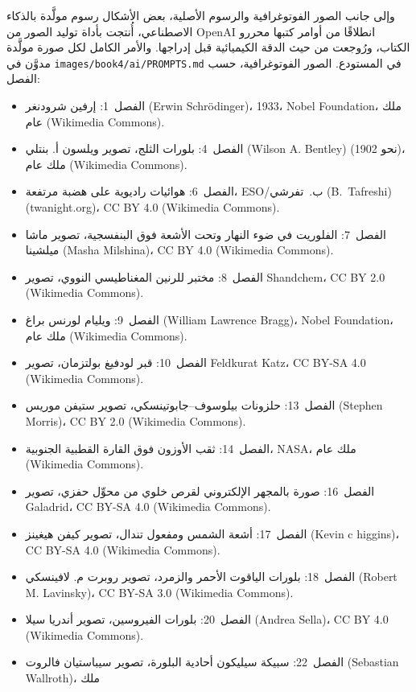 \bigskip
وإلى جانب الصور الفوتوغرافية والرسوم الأصلية، بعض الأشكال
رسوم مولَّدة بالذكاء الاصطناعي، أُنتجت بأداة توليد الصور من OpenAI انطلاقًا من
أوامر كتبها محررو الكتاب، ورُوجعت من حيث الدقة الكيميائية قبل
إدراجها. والأمر الكامل لكل صورة مولَّدة
مدوَّن في \texttt{images/book4/ai/PROMPTS.md} في المستودع.
\bigskip
\noindent الصور الفوتوغرافية، حسب الفصل:
\begin{itemize}\small
  \item الفصل~1: إرفين شرودنغر (Erwin Schr\"odinger)، 1933، Nobel Foundation، ملك عام
        (Wikimedia Commons).
  \item الفصل~4: بلورات الثلج، تصوير ويلسون أ. بنتلي (Wilson A. Bentley) (نحو 1902)، ملك عام
        (Wikimedia Commons).
  \item الفصل~6: هوائيات راديوية على هضبة مرتفعة، ESO/ب.~تفرشي (B.~Tafreshi)
        (twanight.org)، CC BY 4.0 (Wikimedia Commons).
  \item الفصل~7: الفلوريت في ضوء النهار وتحت الأشعة فوق البنفسجية، تصوير ماشا
        ميلشينا (Masha Milshina)، CC BY 4.0 (Wikimedia Commons).
  \item الفصل~8: مختبر للرنين المغناطيسي النووي، تصوير Shandchem، CC BY 2.0 (Wikimedia
        Commons).
  \item الفصل~9: ويليام لورنس براغ (William Lawrence Bragg)، Nobel Foundation، ملك عام
        (Wikimedia Commons).
  \item الفصل~10: قبر لودفيغ بولتزمان، تصوير Feldkurat Katz،
        CC BY-SA 4.0 (Wikimedia Commons).
  \item الفصل~13: حلزونات بيلوسوف--جابوتينسكي، تصوير ستيفن موريس (Stephen Morris)، CC BY 2.0
        (Wikimedia Commons).
  \item الفصل~14: ثقب الأوزون فوق القارة القطبية الجنوبية، NASA، ملك عام (Wikimedia
        Commons).
  \item الفصل~16: صورة بالمجهر الإلكتروني لقرص خلوي من محوِّل حفزي، تصوير
        Galadrid، CC BY-SA 4.0 (Wikimedia Commons).
  \item الفصل~17: أشعة الشمس ومفعول تندال، تصوير كيفن هيغينز (Kevin c higgins)، CC BY-SA 4.0
        (Wikimedia Commons).
  \item الفصل~18: بلورات الياقوت الأحمر والزمرد، تصوير روبرت م. لافينسكي (Robert M. Lavinsky)، CC BY-SA 3.0
        (Wikimedia Commons).
  \item الفصل~20: بلورات الفيروسين، تصوير أندريا سيلا (Andrea Sella)، CC BY 4.0 (Wikimedia
        Commons).
  \item الفصل~22: سبيكة سيليكون أحادية البلورة، تصوير سيباستيان فالروت (Sebastian Wallroth)، ملك

\end{itemize}
